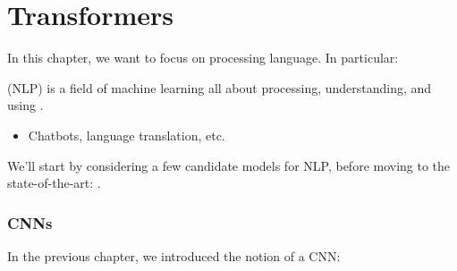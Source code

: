 \setcounter{chapter}{8-1} 

\chapter{Transformers}


In this chapter, we want to focus on processing language. In particular:\\

\begin{definition}
     (NLP) is a field of machine learning all about processing, understanding, and using .
\end{definition}

\begin{itemize}
    \item \miniex Chatbots, language translation, etc.
\end{itemize} 

We'll start by considering a few candidate models for NLP, before moving to the state-of-the-art: .

\subsection{CNNs}

    In the previous chapter, we introduced the notion of a CNN:

